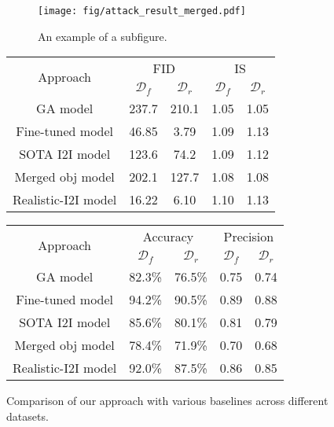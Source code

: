\begin{figure*}
  \centering
  \begin{subfigure}{0.55\linewidth}
    \texttt{[image: fig/attack\_result\_merged.pdf]}
    \caption{An example of a subfigure.}
    \label{fig:attack_CIFAR10}
  \end{subfigure}
  \hfill
  \begin{minipage}{0.40\linewidth}
    \centering
    \vspace{-10em}
    
    \begin{tabular}{ccccc}
      \toprule
      \multirow{2}{*}{Approach} & \multicolumn{2}{c}{FID} & \multicolumn{2}{c}{IS} \\ \cline{2-5}
      & $\mathcal{D}_f$ & $\mathcal{D}_r$ & $\mathcal{D}_f$ & $\mathcal{D}_r$ \\
      \hline
      GA model & 237.7 & 210.1 & 1.05 & 1.05 \\
      Fine-tuned model & 46.85 & 3.79 & 1.09 & 1.13 \\
      SOTA I2I model & 123.6 & 74.2 & 1.09 & 1.12 \\
      Merged obj model & 202.1 & 127.7 & 1.08 & 1.08 \\
      Realistic-I2I model & 16.22 & 6.10 & 1.10 & 1.13 \\
      \bottomrule
    \end{tabular}
    \vspace{1em}
    \label{tab:example1}
    
    \vspace{2em} %
    
    \begin{tabular}{ccccc}
      \toprule
      \multirow{2}{*}{Approach} & \multicolumn{2}{c}{Accuracy} & \multicolumn{2}{c}{Precision} \\ \cline{2-5}
      & $\mathcal{D}_f$ & $\mathcal{D}_r$ & $\mathcal{D}_f$ & $\mathcal{D}_r$ \\
      \hline
      GA model & 82.3\% & 76.5\% & 0.75 & 0.74 \\
      Fine-tuned model & 94.2\% & 90.5\% & 0.89 & 0.88 \\
      SOTA I2I model & 85.6\% & 80.1\% & 0.81 & 0.79 \\
      Merged obj model & 78.4\% & 71.9\% & 0.70 & 0.68 \\
      Realistic-I2I model & 92.0\% & 87.5\% & 0.86 & 0.85 \\
      \bottomrule
    \end{tabular}
    \vspace{1em}
    \label{tab:example2}
  \end{minipage}
  \caption{Comparison of our approach with various baselines across different datasets.}
  \label{fig:short}
\end{figure*}


